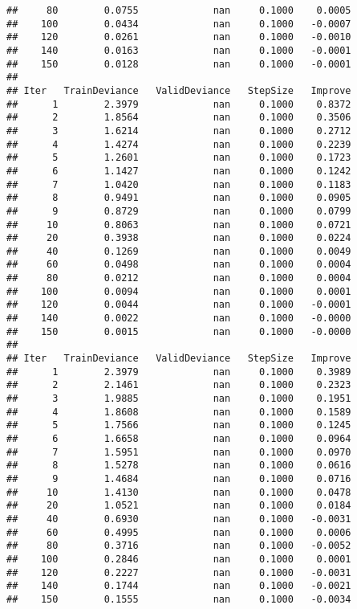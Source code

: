\documentclass[]{article}
\begin{document}
\begin{verbatim}
##     80        0.0755             nan     0.1000    0.0005
##    100        0.0434             nan     0.1000   -0.0007
##    120        0.0261             nan     0.1000   -0.0010
##    140        0.0163             nan     0.1000   -0.0001
##    150        0.0128             nan     0.1000   -0.0001
## 
## Iter   TrainDeviance   ValidDeviance   StepSize   Improve
##      1        2.3979             nan     0.1000    0.8372
##      2        1.8564             nan     0.1000    0.3506
##      3        1.6214             nan     0.1000    0.2712
##      4        1.4274             nan     0.1000    0.2239
##      5        1.2601             nan     0.1000    0.1723
##      6        1.1427             nan     0.1000    0.1242
##      7        1.0420             nan     0.1000    0.1183
##      8        0.9491             nan     0.1000    0.0905
##      9        0.8729             nan     0.1000    0.0799
##     10        0.8063             nan     0.1000    0.0721
##     20        0.3938             nan     0.1000    0.0224
##     40        0.1269             nan     0.1000    0.0049
##     60        0.0498             nan     0.1000    0.0004
##     80        0.0212             nan     0.1000    0.0004
##    100        0.0094             nan     0.1000    0.0001
##    120        0.0044             nan     0.1000   -0.0001
##    140        0.0022             nan     0.1000   -0.0000
##    150        0.0015             nan     0.1000   -0.0000
## 
## Iter   TrainDeviance   ValidDeviance   StepSize   Improve
##      1        2.3979             nan     0.1000    0.3989
##      2        2.1461             nan     0.1000    0.2323
##      3        1.9885             nan     0.1000    0.1951
##      4        1.8608             nan     0.1000    0.1589
##      5        1.7566             nan     0.1000    0.1245
##      6        1.6658             nan     0.1000    0.0964
##      7        1.5951             nan     0.1000    0.0970
##      8        1.5278             nan     0.1000    0.0616
##      9        1.4684             nan     0.1000    0.0716
##     10        1.4130             nan     0.1000    0.0478
##     20        1.0521             nan     0.1000    0.0184
##     40        0.6930             nan     0.1000   -0.0031
##     60        0.4995             nan     0.1000    0.0006
##     80        0.3716             nan     0.1000   -0.0052
##    100        0.2846             nan     0.1000    0.0001
##    120        0.2227             nan     0.1000   -0.0031
##    140        0.1744             nan     0.1000   -0.0021
##    150        0.1555             nan     0.1000   -0.0034

\end{verbatim}
\end{document}
